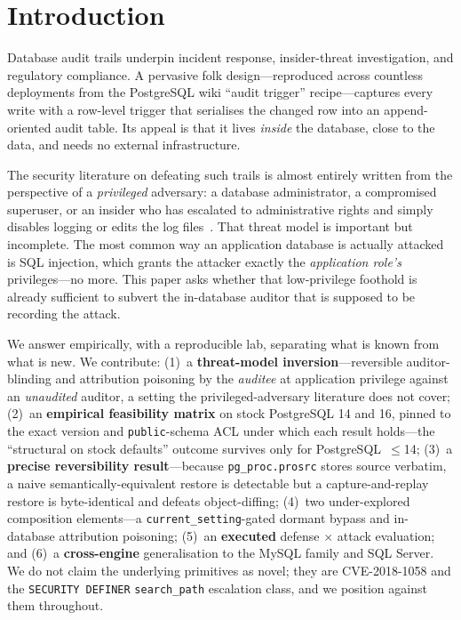 \documentclass[11pt]{article}
\newcommand{\code}[1]{\texttt{#1}}
\begin{document}
\section{Introduction}
Database audit trails underpin incident response, insider-threat investigation, and
regulatory compliance. A pervasive folk design---reproduced across countless deployments
from the PostgreSQL wiki ``audit trigger'' recipe---captures every write with a row-level
trigger that serialises the changed row into an append-oriented audit table. Its appeal is
that it lives \emph{inside} the database, close to the data, and needs no external
infrastructure.

The security literature on defeating such trails is almost entirely written from the
perspective of a \emph{privileged} adversary: a database administrator, a compromised
superuser, or an insider who has escalated to administrative rights and simply disables
logging or edits the log files~\cite{memtracedb}. That threat model is important but
incomplete. The most common way an application database is actually attacked is SQL
injection, which grants the attacker exactly the \emph{application role's} privileges---no
more. This paper asks whether that low-privilege foothold is already sufficient to subvert
the in-database auditor that is supposed to be recording the attack.

We answer empirically, with a reproducible lab, separating what is known from what is new.
We contribute: (1)~a \textbf{threat-model inversion}---reversible auditor-blinding and
attribution poisoning by the \emph{auditee} at application privilege against an
\emph{unaudited} auditor, a setting the privileged-adversary literature does not cover;
(2)~an \textbf{empirical feasibility matrix} on stock PostgreSQL 14 and 16, pinned to the
exact version and \code{public}-schema ACL under which each result holds---the
``structural on stock defaults'' outcome survives only for PostgreSQL~$\leq$14;
(3)~a \textbf{precise reversibility result}---because \code{pg\_proc.prosrc} stores source
verbatim, a naive semantically-equivalent restore is detectable but a capture-and-replay
restore is byte-identical and defeats object-diffing; (4)~two under-explored composition
elements---a \code{current\_setting}-gated dormant bypass and in-database attribution
poisoning; (5)~an \textbf{executed} defense $\times$ attack evaluation; and
(6)~a \textbf{cross-engine} generalisation to the MySQL family and SQL Server. We do not
claim the underlying primitives as novel; they are CVE-2018-1058 and the \code{SECURITY
DEFINER} \code{search\_path} escalation class, and we position against them throughout.
\end{document}
